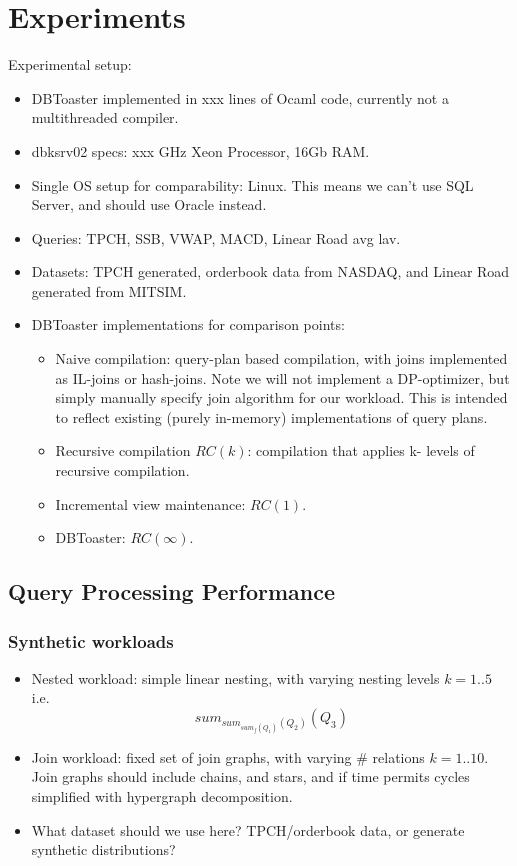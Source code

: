 \documentclass{sig-alternate}
\begin{document}
\section{Experiments}
Experimental setup:
\begin{itemize}
\item DBToaster implemented in xxx lines of Ocaml code, currently not a
  multithreaded compiler.
\item dbksrv02 specs: xxx GHz Xeon Processor, 16Gb RAM.
\item Single OS setup for comparability: Linux. This means we can't use SQL
  Server, and should use Oracle instead.
\item Queries: TPCH, SSB, VWAP, MACD, Linear Road avg lav.
\item Datasets: TPCH generated, orderbook data from NASDAQ, and Linear Road
  generated from MITSIM.
\item DBToaster implementations for comparison points:
    \begin{itemize}
    \item Naive compilation: query-plan based compilation, with joins
      implemented as IL-joins or hash-joins. Note we will not implement a
      DP-optimizer, but simply manually specify join algorithm for our workload.
      This is intended to reflect existing (purely in-memory) implementations of
      query plans.
    \item Recursive compilation $RC(k)$: compilation that applies k- levels of
      recursive compilation.
    \item Incremental view maintenance: $RC(1)$.
    \item DBToaster: $RC(\infty)$.
    \end{itemize}
\end{itemize}

\subsection{Query Processing Performance}
\subsubsection{Synthetic workloads}
\begin{itemize}
\item Nested workload: simple linear nesting, with varying nesting levels $k=1..5$ i.e.
\[sum_{sum_{sum_{f}(Q_1)}(Q_2)}(Q_3)\]

\item Join workload: fixed set of join graphs, with varying \# relations
  $k=1..10$. Join graphs should include chains, and stars, and if time permits
  cycles simplified with hypergraph decomposition.

\item What dataset should we use here? TPCH/orderbook data, or generate
  synthetic distributions?
\end{itemize}
\end{document}

